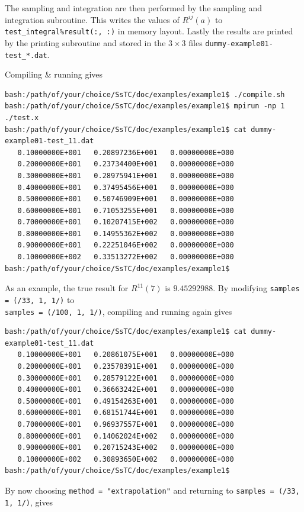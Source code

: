\documentclass[10pt,a4paper]{article}
\begin{document}
The sampling and integration are then performed by the sampling and integration subroutine. This writes the values of $R^{ij}(a)$ to \verb|test_integral%result(:, :)| in memory layout. Lastly the results are printed by the printing subroutine and stored in the $3\times 3$ files \verb|dummy-example01-test_*.dat|.

Compiling \& running gives
\begin{codebox}{}
\begin{verbatim}
bash:/path/of/your/choice/SsTC/doc/examples/example1$ ./compile.sh
bash:/path/of/your/choice/SsTC/doc/examples/example1$ mpirun -np 1 ./test.x
bash:/path/of/your/choice/SsTC/doc/examples/example1$ cat dummy-example01-test_11.dat
   0.10000000E+001   0.20897236E+001   0.00000000E+000
   0.20000000E+001   0.23734400E+001   0.00000000E+000
   0.30000000E+001   0.28975941E+001   0.00000000E+000
   0.40000000E+001   0.37495456E+001   0.00000000E+000
   0.50000000E+001   0.50746909E+001   0.00000000E+000
   0.60000000E+001   0.71053255E+001   0.00000000E+000
   0.70000000E+001   0.10207415E+002   0.00000000E+000
   0.80000000E+001   0.14955362E+002   0.00000000E+000
   0.90000000E+001   0.22251046E+002   0.00000000E+000
   0.10000000E+002   0.33513272E+002   0.00000000E+000
bash:/path/of/your/choice/SsTC/doc/examples/example1$
\end{verbatim}
\end{codebox}
As an example, the true result for $R^{11}(7) $ is $9.45292988$. By modifying \verb|samples = (/33, 1, 1/)| to \\ \verb|samples = (/100, 1, 1/)|, compiling and running again gives
\begin{codebox}{}
\begin{verbatim}
bash:/path/of/your/choice/SsTC/doc/examples/example1$ cat dummy-example01-test_11.dat
   0.10000000E+001   0.20861075E+001   0.00000000E+000
   0.20000000E+001   0.23578391E+001   0.00000000E+000
   0.30000000E+001   0.28579122E+001   0.00000000E+000
   0.40000000E+001   0.36663242E+001   0.00000000E+000
   0.50000000E+001   0.49154263E+001   0.00000000E+000
   0.60000000E+001   0.68151744E+001   0.00000000E+000
   0.70000000E+001   0.96937557E+001   0.00000000E+000
   0.80000000E+001   0.14062024E+002   0.00000000E+000
   0.90000000E+001   0.20715243E+002   0.00000000E+000
   0.10000000E+002   0.30893650E+002   0.00000000E+000
bash:/path/of/your/choice/SsTC/doc/examples/example1$
\end{verbatim}
\end{codebox}
By now choosing \verb|method = "extrapolation"| and returning to \verb|samples = (/33, 1, 1/)|, gives
\end{document}
